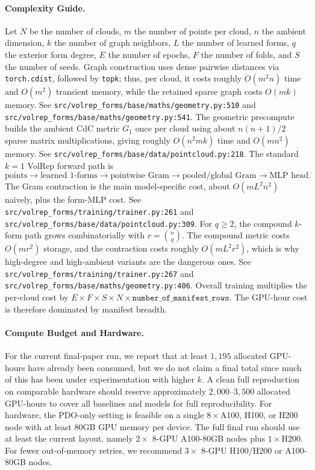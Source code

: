 \documentclass{article}
\theoremstyle{remark}
\theoremstyle{plain}
\begin{document}
\paragraph{Complexity Guide.}
Let $N$ be the number of clouds, $m$ the number of points per cloud, $n$ the ambient dimension, $k$ the number of graph neighbors, $L$ the number of learned forms, $q$ the exterior form degree, $E$ the number of epochs, $F$ the number of folds, and $S$ the number of seeds. Graph construction uses dense pairwise distances via \texttt{torch.cdist}, followed by \texttt{topk}; thus, per cloud, it costs roughly $O(m^2 n)$ time and $O(m^2)$ transient memory, while the retained sparse graph costs $O(mk)$ memory. See \texttt{src/volrep\_forms/base/maths/geometry.py:510} and \texttt{src/volrep\_forms/base/maths/geometry.py:541}. The geometric precompute builds the ambient CdC metric $G_1$ once per cloud using about $n(n+1)/2$ sparse matrix multiplications, giving roughly $O(n^2 m k)$ time and $O(m n^2)$ memory. See \texttt{src/volrep\_forms/base/data/pointcloud.py:218}. The standard $k=1$ VolRep forward path is
\[
\text{points} \to \text{learned 1-forms} \to \text{pointwise Gram} \to \text{pooled/global Gram} \to \text{MLP head}.
\]
The Gram contraction is the main model-specific cost, about $O(m L^2 n^2)$ naively, plus the form-MLP cost. See \texttt{src/volrep\_forms/training/trainer.py:261} and \texttt{src/volrep\_forms/base/data/pointcloud.py:309}. For $q \geq 2$, the compound $k$-form path grows combinatorially with $r = \binom{n}{q}$. The compound metric costs $O(m r^2)$ storage, and the contraction costs roughly $O(m L^2 r^2)$, which is why high-degree and high-ambient variants are the dangerous ones. See \texttt{src/volrep\_forms/training/trainer.py:267} and \texttt{src/volrep\_forms/base/maths/geometry.py:406}. Overall training multiplies the per-cloud cost by $E \times F \times S \times N \times \texttt{number\_of\_manifest\_rows}$. The GPU-hour cost is therefore dominated by manifest breadth. 

\paragraph{Compute Budget and Hardware.}
For the current final-paper run, we report that at least $1{,}195$ allocated GPU-hours have already been consumed, but we do not claim a final total since much of this has been under experimentation with higher \(k\). A clean full reproduction on comparable hardware should reserve approximately $2{,}000$--$3{,}500$ allocated GPU-hours to cover all baselines and models for full reproducibility. For hardware, the PDO-only setting is feasible on a single $8{\times}$A100, H100, or H200 node with at least 80GB GPU memory per device. The full final run should use at least the current layout, namely $2{\times}$ $8$-GPU A100-80GB nodes plus $1{\times}$H200. For fewer out-of-memory retries, we recommend $3{\times}$ $8$-GPU H100/H200 or A100-80GB nodes.
\end{document}

